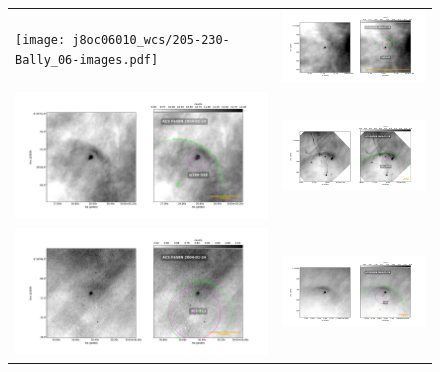 \documentclass{article}
\begin{document}
\begin{figure}[htp]
\centering
\begin{tabular}{l l}
  
    \texttt{[image: j8oc06010\_wcs/205-230-Bally\_06-images.pdf]}
    &\includegraphics[width=0.5\linewidth]{j8oc06010_wcs/212-400-Bally_06-images.pdf}\\
    \includegraphics[width=0.5\linewidth]{j8oc06010_wcs/w266-558-Bally_06-images.pdf}
    &\includegraphics[width=0.5\linewidth]{j8oc07010_wcs/261-3018-Bally_07-images.pdf}\\
    \includegraphics[width=0.5\linewidth]{j8oc07010_wcs/305-811-Bally_07-images.pdf}
    &\includegraphics[width=0.5\linewidth]{j8oc07010_wcs/LL5-Bally_07-images.pdf}\\
   
\end{tabular}
\end{figure}
 
\end{document}
